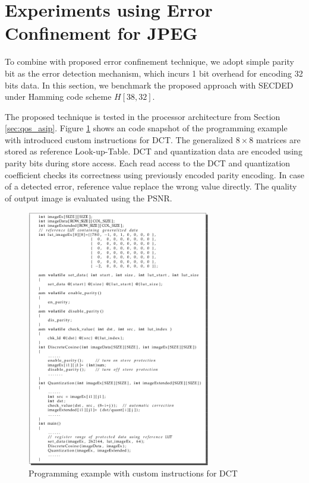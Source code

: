 \section{Experiments using Error Confinement for JPEG} \label{sec:exp}
To combine with proposed error confinement technique, we adopt simple parity bit as the error detection mechanism, which incurs 1 bit overhead for encoding 32 bits data. In this section, we benchmark the proposed approach with SECDED under Hamming code scheme $H[38, 32]$.

The proposed technique is tested in the processor architecture from Section \ref{sec:qos_asip}. Figure \ref{fig:qos_program} shows an code snapshot of the programming example with introduced custom instructions for DCT. The generalized $8 \times 8$ matrices are stored as reference Look-up-Table. DCT and quantization data are encoded using parity bits during store access. Each read access to the DCT and quantization coefficient checks its correctness using previously encoded parity encoding. In case of a detected error, reference value replace the wrong value directly. The quality of output image is evaluated using the PSNR.

\begin{figure}
\centering
\includegraphics[width=80mm]{./eps/qos_program}
\caption{Programming example with custom instructions for DCT}
\vspace{-4mm}
\label{fig:qos_program}
\end{figure}

